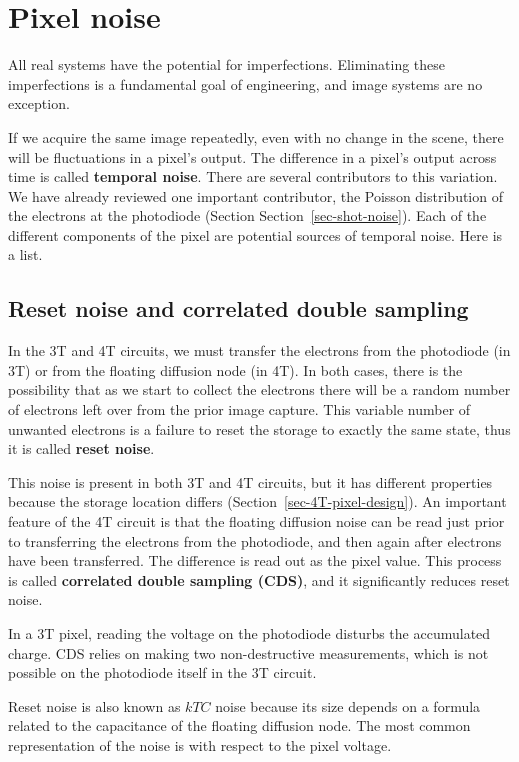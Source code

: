 \documentclass[
  letterpaper,
]{book}
\begin{document}
\section{Pixel noise}\label{sec-pixel-noise}

All real systems have the potential for imperfections. Eliminating these
imperfections is a fundamental goal of engineering, and image systems
are no exception.

If we acquire the same image repeatedly, even with no change in the
scene, there will be fluctuations in a pixel's output. The difference in
a pixel's output across time is called \textbf{temporal noise}. There
are several contributors to this variation. We have already reviewed one
important contributor, the Poisson distribution of the electrons at the
photodiode (Section Section~\ref{sec-shot-noise}). Each of the different
components of the pixel are potential sources of temporal noise. Here is
a list.

\subsection{Reset noise and correlated double
sampling}\label{sec-reset-noise-cds}

In the 3T and 4T circuits, we must transfer the electrons from the
photodiode (in 3T) or from the floating diffusion node (in 4T). In both
cases, there is the possibility that as we start to collect the
electrons there will be a random number of electrons left over from the
prior image capture. This variable number of unwanted electrons is a
failure to reset the storage to exactly the same state, thus it is
called \textbf{reset noise}.

This noise is present in both 3T and 4T circuits, but it has different
properties because the storage location differs
(Section~\ref{sec-4T-pixel-design}). An important feature of the 4T
circuit is that the floating diffusion noise can be read just prior to
transferring the electrons from the photodiode, and then again after
electrons have been transferred. The difference is read out as the pixel
value. This process is called \textbf{correlated double sampling (CDS)},
and it significantly reduces reset noise.

In a 3T pixel, reading the voltage on the photodiode disturbs the
accumulated charge. CDS relies on making two non-destructive
measurements, which is not possible on the photodiode itself in the 3T
circuit.

Reset noise is also known as \(kTC\) noise because its size depends on a
formula related to the capacitance of the floating diffusion node. The
most common representation of the noise is with respect to the pixel
voltage.
\end{document}
